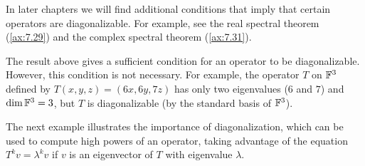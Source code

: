 In later chapters we will find additional conditions that imply that certain
operators are diagonalizable. For example, see the real spectral theorem
(\ref{ax:7.29}) and the complex spectral theorem (\ref{ax:7.31}).

The result above gives a sufficient condition for an operator to be
diagonalizable. However, this condition is not necessary. For example, the
operator $T$ on $\mathbb{F}^3$ defined by $T(x,y,z)=(6x,6y,7z)$ has only two eigenvalues
($6$ and $7$) and $\operatorname{dim}\mathbb{F}^3=3$, but $T$ is diagonalizable (by the standard basis
of $\mathbb{F}^3$).

%
The next example illustrates the importance of diagonalization, which can be used
to compute high powers of an operator, taking advantage of the equation
$T^kv=\lambda^kv$ if $v$ is an eigenvector of $T$ with eigenvalue $\lambda$.

